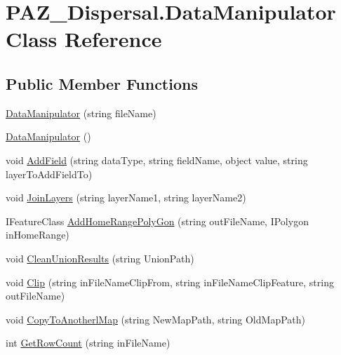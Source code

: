 \hypertarget{class_p_a_z___dispersal_1_1_data_manipulator}{\section{P\-A\-Z\-\_\-\-Dispersal.\-Data\-Manipulator Class Reference}
\label{class_p_a_z___dispersal_1_1_data_manipulator}
}
\subsection*{Public Member Functions}
\begin{DoxyCompactItemize}
\item 
\hyperlink{class_p_a_z___dispersal_1_1_data_manipulator_a0514e4f9604e415da1c551bad4641a0c}{Data\-Manipulator} (string file\-Name)
\item 
\hyperlink{class_p_a_z___dispersal_1_1_data_manipulator_ada661212a285a24b95c3b41952d45103}{Data\-Manipulator} ()
\item 
void \hyperlink{class_p_a_z___dispersal_1_1_data_manipulator_a3c6a7d060bc55d7104105af0eddb6fb1}{Add\-Field} (string data\-Type, string field\-Name, object value, string layer\-To\-Add\-Field\-To)
\item 
void \hyperlink{class_p_a_z___dispersal_1_1_data_manipulator_a864571e8c76abd47666e54e7ae466d90}{Join\-Layers} (string layer\-Name1, string layer\-Name2)
\item 
I\-Feature\-Class \hyperlink{class_p_a_z___dispersal_1_1_data_manipulator_a645048e12966f35905dcc02175607150}{Add\-Home\-Range\-Poly\-Gon} (string out\-File\-Name, I\-Polygon in\-Home\-Range)
\item 
void \hyperlink{class_p_a_z___dispersal_1_1_data_manipulator_a61178e92655b749b9ec9431e6ee94b2f}{Clean\-Union\-Results} (string Union\-Path)
\item 
void \hyperlink{class_p_a_z___dispersal_1_1_data_manipulator_a0f1385ecedd7e23f0cb1bd1bddc50296}{Clip} (string in\-File\-Name\-Clip\-From, string in\-File\-Name\-Clip\-Feature, string out\-File\-Name)
\item 
void \hyperlink{class_p_a_z___dispersal_1_1_data_manipulator_a8a613536132337005499b8d5241aee2f}{Copy\-To\-Anotherl\-Map} (string New\-Map\-Path, string Old\-Map\-Path)
\item 
int \hyperlink{class_p_a_z___dispersal_1_1_data_manipulator_ad4ace2f564bb1ce5467b0e73b66c79ed}{Get\-Row\-Count} (string in\-File\-Name)
\item 

\end{DoxyCompactItemize}
